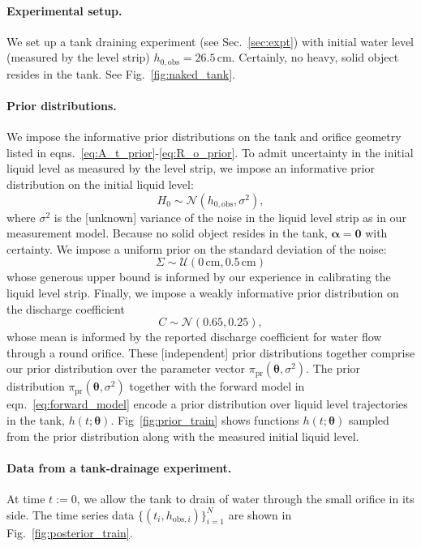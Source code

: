 \documentclass[openacc]{rsproca_new}%
\newcommand\thedata {$\{(t_i,h_{\text{obs}, i})\}_{i=1}^{N}$\xspace}
\begin{document}
\paragraph{Experimental setup.}
We set up a tank draining experiment (see Sec.~\ref{sec:expt}) with initial water level (measured by the level strip) $h_{0, \text{obs}}=26.5$\,cm. 
Certainly, no heavy, solid object resides in the tank. See Fig.~\ref{fig:naked_tank}.

\paragraph{Prior distributions.} We impose the informative prior distributions on the tank and orifice geometry listed in eqns.~\ref{eq:A_t_prior}-\ref{eq:R_o_prior}.  To admit uncertainty in the initial liquid level as measured by the level strip, we impose an informative prior distribution on the initial liquid level:
\begin{equation}
	H_0 \sim \mathcal{N}(h_{0, \text{obs}}, \sigma^2),
\end{equation} where $\sigma^2$ is the [unknown] variance of the noise in the liquid level strip as in our measurement model.
Because no solid object resides in the tank, $\boldsymbol \alpha=\mathbf{0}$ with certainty. 
We impose a uniform prior on the standard deviation of the noise:
\begin{equation}
\Sigma \sim \mathcal{U}(0\,\text{cm}, 0.5\,\text{cm})
\end{equation} whose generous upper bound is informed by our experience in calibrating the liquid level strip. Finally, we impose a weakly informative prior distribution on the discharge coefficient
\begin{equation}
	C \sim \mathcal{N}(0.65, 0.25),
\end{equation} whose mean is informed by the reported discharge coefficient for water flow through a round orifice. 
These [independent] prior distributions together comprise our prior distribution over the parameter vector $\pi_{\text{pr}}(\boldsymbol \theta, \sigma^2)$. 
The prior distribution $\pi_{\text{pr}}(\boldsymbol \theta, \sigma^2)$ together with the forward model in eqn.~\ref{eq:forward_model} encode a prior distribution over liquid level trajectories in the tank, $h(t; \boldsymbol \theta)$. Fig~\ref{fig:prior_train} shows functions $h(t; \boldsymbol \theta)$ sampled from the prior distribution along with the measured initial liquid level. 

\paragraph{Data from a tank-drainage experiment.} At time $t:=0$, we allow the tank to drain of water through the small orifice in its side. The time series data \thedata are shown in Fig.~\ref{fig:posterior_train}.
\end{document}
